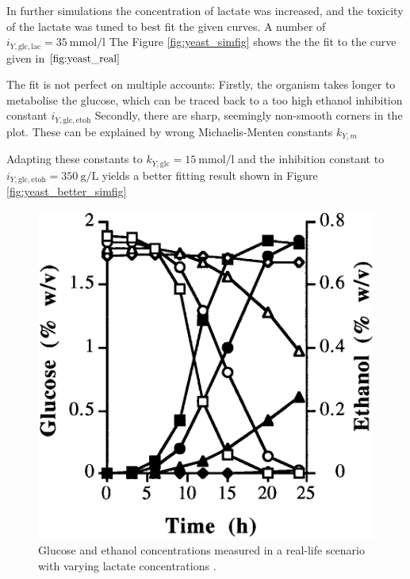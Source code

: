 		In further simulations the concentration of lactate was increased, and the toxicity of the lactate was tuned to best fit the given curves.
		A number of $i_{Y,\mathrm{glc,lac}}=\SI{35}{\milli\mole\per\litre}$
		The Figure \ref{fig:yeast_simfig} shows the the fit to the curve given in $\ref{fig:yeast_real}$
		
		The fit is not perfect on multiple accounts: Firstly, the organism takes longer to metabolise the glucose, which can be traced back to a too high ethanol inhibition constant $i_{Y,\mathrm{glc,etoh}}$
		Secondly, there are sharp, seemingly non-smooth corners in the plot. These can be explained by wrong Michaelis-Menten constants $k_{Y,m}$
		
		Adapting these constants to $k_{Y,\mathrm{glc}}=\SI{15}{\milli\mole\per\litre}$ and the inhibition constant to $i_{Y,\mathrm{glc,etoh}}=\SI{350}{\gram\per\liter}$ yields a better fitting result
		shown in Figure \ref{fig:yeast_better_simfig}
		
		\begin{figure}[h]
			\centering
			\includegraphics[width=0.75\linewidth]{figures/yeast_real.png}
			\caption{Glucose and ethanol concentrations measured in a real-life scenario with varying lactate concentrations \cite{Narendranath2001}. }
			\label{fig:yeast_real}
		\end{figure}
		
